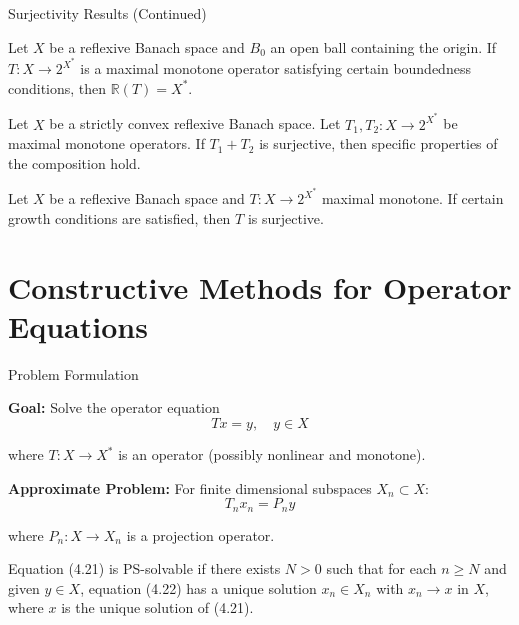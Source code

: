 \documentclass[aspectratio=169,10pt]{beamer}
\begin{document}
\begin{frame}[allowframebreaks]{Surjectivity Results (Continued)}

\begin{theorem}[Theorem 4.25]
Let $X$ be a reflexive Banach space and $B_0$ an open ball containing the origin. If $T : X \to 2^{X^*}$ is a maximal monotone operator satisfying certain boundedness conditions, then $\mathbb{R}(T) = X^*$.
\end{theorem}

\begin{theorem}[Theorem 4.30]
Let $X$ be a strictly convex reflexive Banach space. Let $T_1, T_2 : X \to 2^{X^*}$ be maximal monotone operators. If $T_1 + T_2$ is surjective, then specific properties of the composition hold.
\end{theorem}

\begin{theorem}[Theorem 4.32]
Let $X$ be a reflexive Banach space and $T : X \to 2^{X^*}$ maximal monotone. If certain growth conditions are satisfied, then $T$ is surjective.
\end{theorem}

\end{frame}


\section{Constructive Methods for Operator Equations}

\begin{frame}{Problem Formulation}

\textbf{Goal:} Solve the operator equation
$$Tx = y, \quad y \in X$$

where $T : X \to X^*$ is an operator (possibly nonlinear and monotone).

\vspace{0.3cm}

\textbf{Approximate Problem:} For finite dimensional subspaces $X_n \subset X$:
$$T_n x_n = P_n y$$

where $P_n : X \to X_n$ is a projection operator.

\vspace{0.3cm}

\begin{definition}
Equation (4.21) is PS-solvable if there exists $N > 0$ such that for each $n \geq N$ and given $y \in X$, equation (4.22) has a unique solution $x_n \in X_n$ with $x_n \to x$ in $X$, where $x$ is the unique solution of (4.21).
\end{definition}

\end{frame}
\end{document}
